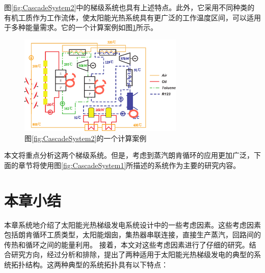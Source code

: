 图\ref{fig:CascadeSystem2}中的梯级系统也具有上述特点。此外，它采用不同种类的有机工质作为工作流体，使太阳能光热系统具有更广泛的工作温度区间，可以适用于多种能量需求。它的一个计算案例如图\ref{fig:Ex_CascadeSystem2}所示。
\begin{figure}[htbp]
\centering 
\includegraphics[width=0.7\textwidth]{fig/Ex_CascadeSystem2}
\caption{图\ref{fig:CascadeSystem2}的一个计算案例}
\label{fig:Ex_CascadeSystem2}
\end{figure}
本文将重点分析这两个梯级系统。但是，考虑到蒸汽朗肯循环的应用更加广泛，下面的章节将使用图\ref{fig:CascadeSystem1}所描述的系统作为主要的研究内容。

\newpage
\section{本章小结}
本章系统地介绍了太阳能光热梯级发电系统设计中的一些考虑因素。这些考虑因素包括朗肯循环工质类型，太阳能烟囱，集热器串联连接，直接生产蒸汽，回路间的传热和循环之间的能量利用。
接着，本文对这些考虑因素进行了仔细的研究。结合研究方向，经过分析和排除，提出了两种适用于太阳能光热梯级发电的典型的系统拓扑结构。这两种典型的系统拓扑具有以下特点：


